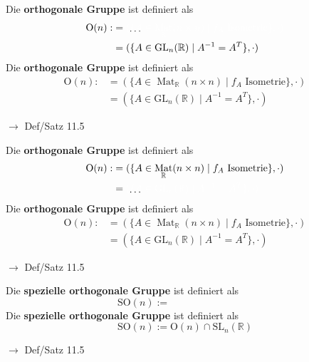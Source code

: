 \documentclass[11pt]{article}
\renewcommand{\cite}[1]{\par\bigskip\hfill{\color{gray}\tiny\(\to\) #1}}
\newcommand{\RR}{\mathbb{R}}
\DeclareMathOperator{\Mat}{Mat}
\newcommand{\hide}[1]{\parbox{0cm}{\raisebox{-7pt}[0cm]{\dots}}\color{white}#1\color{black}}
\let\olddots\dots
\renewcommand{\dots}{\,\olddots\,}
\newenvironment{field}{}{\newpage}
\newif\ifnote
\newenvironment{note}{\notetrue}{\notefalse}
\newcommand{\localtag}{}
\newcommand{\globaltag}{}
\newcommand{\uuid}{}
\newcommand{\tags}[1]{
    \ifnote
        \renewcommand{\localtag}{#1}
    \else
        \renewcommand{\globaltag}{#1}
    \fi
    }
\newcommand{\xplain}[1]{\renewcommand{\uuid}{#1}}
\begin{document}
\begin{note}
    \tags{Def Satz}
    \xplain{9a5ba794-c30d-11ec-9d64-0242ac120002}
    \begin{field}
        Die \textbf{orthogonale Gruppe} ist definiert als
        \begin{align*}
            \text{O}(n) :&= \hide{(\{A\in\Mat_{\RR}(n\times n) \mid f_A \text{ Isometrie}\}, \cdot)}\\
            &= (\{A \in \text{GL}_n(\RR) \mid A^{-1} = A^T\}, \cdot)
        \end{align*}
    \end{field}
    \begin{field}
        Die \textbf{orthogonale Gruppe} ist definiert als
        \begin{align*}
            \text{O}(n) :&= (\{A\in\Mat_{\RR}(n\times n) \mid f_A \text{ Isometrie}\}, \cdot)\\
            &= (\{A \in \text{GL}_n(\RR) \mid A^{-1} = A^T\}, \cdot)
        \end{align*}
        \cite{Def/Satz 11.5}
    \end{field}

    \begin{field}
        Die \textbf{orthogonale Gruppe} ist definiert als
        \begin{align*}
            \text{O}(n) :&= (\{A\in\Mat_{\RR}(n\times n) \mid f_A \text{ Isometrie}\}, \cdot)\\
            &= \hide{(\{A \in \text{GL}_n(\RR) \mid A^{-1} = A^T\}, \cdot)}
        \end{align*}
    \end{field}
    \begin{field}
        Die \textbf{orthogonale Gruppe} ist definiert als
        \begin{align*}
            \text{O}(n) :&= (\{A\in\Mat_{\RR}(n\times n) \mid f_A \text{ Isometrie}\}, \cdot)\\
            &= (\{A \in \text{GL}_n(\RR) \mid A^{-1} = A^T\}, \cdot)
        \end{align*}
        \cite{Def/Satz 11.5}
    \end{field}

    \begin{field}
        Die \textbf{spezielle orthogonale Gruppe} ist definiert als
        \[\text{SO}(n) := \phantom{\text{O}(n) \cap \text{SL}_n(\RR)}\]
    \end{field}
    \begin{field}
        Die \textbf{spezielle orthogonale Gruppe} ist definiert als
        \[\text{SO}(n) := \text{O}(n) \cap \text{SL}_n(\RR)\]
        \cite{Def/Satz 11.5}
    \end{field}
\end{note}
\end{document}
